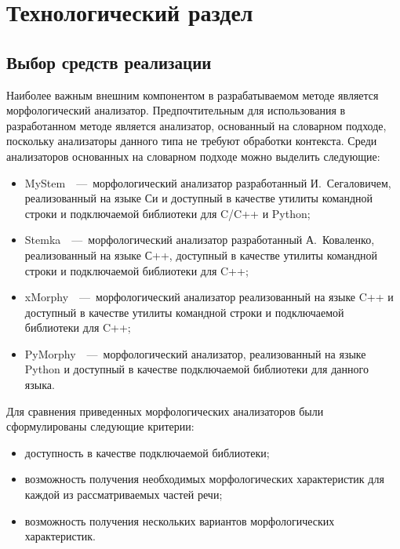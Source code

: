 \chapter{Технологический раздел}

\section{Выбор средств реализации}

Наиболее важным внешним компонентом в разрабатываемом методе является морфологический анализатор. Предпочтительным для использования в разработанном методе является анализатор, основанный на словарном подходе, поскольку анализаторы данного типа не требуют обработки контекста. Среди анализаторов основанных на словарном подходе можно выделить следующие:
\begin{itemize}
	\item MyStem~\cite{segalovich2003fast}~---~морфологический анализатор разработанный И.~Сегаловичем, реализованный на языке Си и доступный в качестве утилиты командной строки и подключаемой библиотеки для C/C++ и Python;
	\item Stemka~\cite{StemkaWebsite}~---~морфологический анализатор разработанный А.~Коваленко, реализованный на языке С++, доступный в качестве утилиты командной строки и подключаемой библиотеки для C++;
	\item xMorphy~\cite{Sapin_2023}~---~морфологический анализатор реализованный на языке C++ и доступный в качестве утилиты командной строки и подключаемой библиотеки для C++;
	\item PyMorphy~\cite{Pymorphy2Internals}~---~морфологический анализатор, реализованный на языке Python и доступный в качестве подключаемой библиотеки для данного языка.
\end{itemize}

Для сравнения приведенных морфологических анализаторов были сформулированы следующие критерии:
\begin{itemize}
	\item доступность в качестве подключаемой библиотеки;
	\item возможность получения необходимых морфологических характеристик для каждой из рассматриваемых частей речи;
	\item возможность получения нескольких вариантов морфологических характеристик.
\end{itemize}

